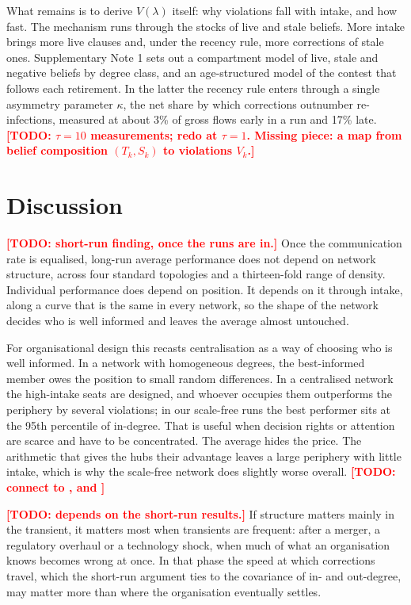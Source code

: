 \documentclass[11pt]{article}
\newcommand{\todo}[1]{\textcolor{red}{\textbf{[TODO: #1]}}}
\begin{document}
What remains is to derive $V(\lambda)$ itself: why violations fall with intake, and how fast. The mechanism runs through the stocks of live and stale beliefs. More intake brings more live clauses and, under the recency rule, more corrections of stale ones. Supplementary Note 1 sets out a compartment model of live, stale and negative beliefs by degree class, and an age-structured model of the contest that follows each retirement. In the latter the recency rule enters through a single asymmetry parameter $\kappa$, the net share by which corrections outnumber re-infections, measured at about 3\% of gross flows early in a run and 17\% late. \todo{$\tau = 10$ measurements; redo at $\tau = 1$. Missing piece: a map from belief composition $(T_k, S_k)$ to violations $V_k$.}


\section{Discussion}\label{sec:discussion}

\todo{short-run finding, once the runs are in.} Once the communication rate is equalised, long-run average performance does not depend on network structure, across four standard topologies and a thirteen-fold range of density. Individual performance does depend on position. It depends on it through intake, along a curve that is the same in every network, so the shape of the network decides who is well informed and leaves the average almost untouched.

For organisational design this recasts centralisation as a way of choosing who is well informed. In a network with homogeneous degrees, the best-informed member owes the position to small random differences. In a centralised network the high-intake seats are designed, and whoever occupies them outperforms the periphery by several violations; in our scale-free runs the best performer sits at the 95th percentile of in-degree. That is useful when decision rights or attention are scarce and have to be concentrated. The average hides the price. The arithmetic that gives the hubs their advantage leaves a large periphery with little intake, which is why the scale-free network does slightly worse overall. \todo{connect to \textcite{simon1962architecture}, \textcite{bolton1994firm} and \textcite{lazer2007network}}

\todo{depends on the short-run results.} If structure matters mainly in the transient, it matters most when transients are frequent: after a merger, a regulatory overhaul or a technology shock, when much of what an organisation knows becomes wrong at once. In that phase the speed at which corrections travel, which the short-run argument ties to the covariance of in- and out-degree, may matter more than where the organisation eventually settles.
\end{document}
